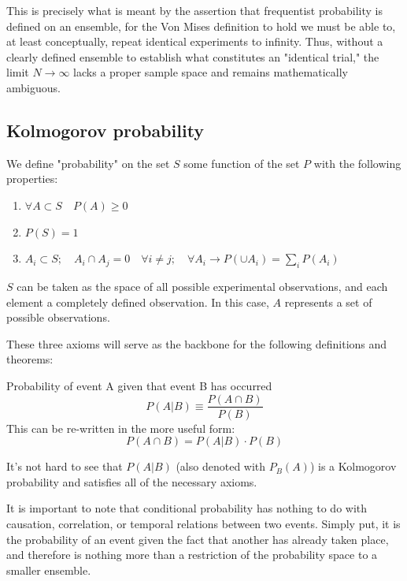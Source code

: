 This is precisely what is meant by the assertion that frequentist probability is defined on an ensemble, for the Von Mises definition to hold we must be able to, at least conceptually, repeat identical experiments to infinity. Thus, without a clearly defined ensemble to establish what constitutes an "identical trial," the limit $N \to \infty$ lacks a proper sample space and remains mathematically ambiguous.

\subsection{Kolmogorov probability}
\label{subsec:kolmogorov}

	We define "probability" on the set $S$ some function of the set $P$ with the following properties:
\begin{enumerate}
	
	\item $\forall A \subset S \quad P(A)\geq 0$
	\item $P(S) = 1$
	\item $A_i \subset S ;\quad A_i\cap A_j = 0 \quad \forall i\neq j ;\quad \forall A_i \rightarrow P(\cup A_i) = \sum\limits_{i}P(A_i)$
	
\end{enumerate}

$S$ can be taken as the space of all possible experimental observations, and each element a completely defined observation. In this case, $A$ represents a set of possible observations.


These three axioms will serve as the backbone for the following definitions and theorems:

\begin{definition}
	Probability of event A given that event B has occurred
	\[
	P(A|B) \equiv \frac{P(A\cap B)}{P(B)}
	\]
This can be re-written in the more useful form:
	\[
	P(A\cap B)= P(A|B)\cdot P(B)
	\]
\end{definition}

It's not hard to see that $P(A|B)$ (also denoted with $P_B(A)$) is a Kolmogorov probability and satisfies all of the necessary axioms.

It is important to note that conditional probability has nothing to do with causation, correlation, or temporal relations between two events. Simply put, it is the probability of an event given the fact that another has already taken place, and therefore is nothing more than a restriction of the probability space to a smaller ensemble. 

